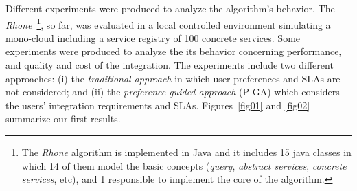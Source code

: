 

Different experiments were produced to analyze the algorithm's
behavior. The \textit{Rhone}~\footnote{The \textit{Rhone} algorithm is implemented in
Java and it includes 15 java classes in which 14 of them model the basic concepts (\textit{query}, \textit{abstract services}, \textit{concrete services}, etc), 
and 1 responsible to implement the core of the algorithm. 
}, so far, was evaluated in a local controlled
environment simulating a mono-cloud including a service registry of 100 concrete
services. Some experiments were produced to analyze the its behavior
concerning performance, and quality and cost of the integration.
The experiments include two different approaches: (i) the \textit{traditional
approach} in which user preferences and SLAs are not considered; and (ii) the
\textit{preference-guided approach} (P-GA) which considers the users'
integration requirements and SLAs.
Figures~\ref{fig01} and \ref{fig02} summarize our first results.

